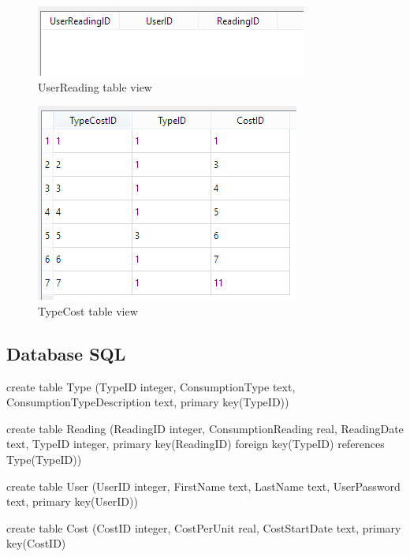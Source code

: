 \begin{figure}[H]
	\includegraphics{./maintenance/images/UserReading_Table_Entries.png}
	\caption{UserReading table view}
\end{figure}

\begin{figure}[H]
	\includegraphics{./maintenance/images/TypeCost_Table_Entries.png}
	\caption{TypeCost table view}
\end{figure}

\subsection{Database SQL}
\begin{sql}
create table Type
(TypeID integer,
ConsumptionType text,
ConsumptionTypeDescription text,
primary key(TypeID))
\end{sql}

\begin{sql}
create table Reading
(ReadingID integer,
ConsumptionReading real,
ReadingDate text,
TypeID integer,
primary key(ReadingID)
foreign key(TypeID) references Type(TypeID))
\end{sql}

\begin{sql}
create table User
(UserID integer,
FirstName text,
LastName text,
UserPassword text,
primary key(UserID))
\end{sql}

\begin{sql}
create table Cost
(CostID integer,
CostPerUnit real,
CostStartDate text,
primary key(CostID)
\end{sql}

